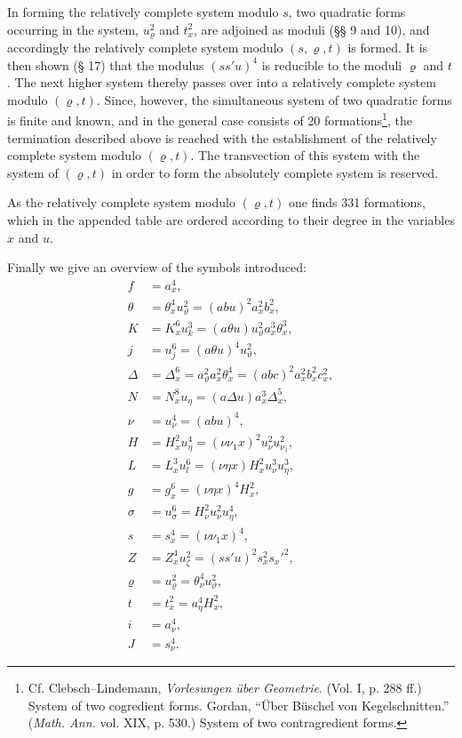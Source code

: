 \documentclass[11pt]{article}
\begin{document}
In forming the relatively complete system modulo $s$, two quadratic forms occurring in the system, $u_\varrho^2$ and $t_x^2$, are adjoined as moduli (§§ 9 and 10), and accordingly the relatively complete system modulo $(s,\varrho,t)$ is formed. It is then shown (§ 17) that the modulus $(ss'u)^4$ is reducible to the moduli $\varrho$ and $t$. The next higher system thereby passes over into a relatively complete system modulo $(\varrho,t)$. Since, however, the simultaneous system of two quadratic forms is finite and known, and in the general case consists of 20 formations\footnote{Cf. Clebsch--Lindemann, \emph{Vorlesungen über Geometrie}. (Vol. I, p. 288 ff.) System of two cogredient forms. Gordan, ``Über Büschel von Kegelschnitten.'' (\emph{Math. Ann.} vol. XIX, p. 530.) System of two contragredient forms.}, the termination described above is reached with the establishment of the relatively complete system modulo $(\varrho,t)$. The transvection of this system with the system of $(\varrho,t)$ in order to form the absolutely complete system is reserved.

As the relatively complete system modulo $(\varrho,t)$ one finds 331 formations, which in the appended table are ordered according to their degree in the variables $x$ and $u$.

Finally we give an overview of the symbols introduced:
\begin{align*}
f&=a_x^4,\\
\theta&=\theta_x^4u_\vartheta^2=(abu)^2a_x^2b_x^2,\\
K&=K_x^6u_k^3=(a\theta u)u_\vartheta^2a_x^3\theta_x^3,\\
j&=u_j^6=(a\theta u)^4u_\vartheta^2,\\
\Delta&=\Delta_x^6=a_\vartheta^2a_x^2\theta_x^4=(abc)^2a_x^2b_x^2c_x^2,\\
N&=N_x^8u_\eta=(a\Delta u)a_x^3\Delta_x^5,\\
\nu&=u_\nu^4=(abu)^4,\\
H&=H_x^2u_\eta^4=(\nu\nu_1x)^2u_\nu^2u_{\nu_1}^2,\\
L&=L_x^3u_l^6=(\nu\eta x)H_x^2u_\nu^3u_\eta^3,\\
g&=g_x^6=(\nu\eta x)^4H_x^2,\\
\sigma&=u_\sigma^6=H_\nu^2u_\nu^2u_\eta^4,\\
s&=s_x^4=(\nu\nu_1x)^4,\\
Z&=Z_x^4u_\zeta^2=(ss'u)^2s_x^2s_x'^2,\\
\varrho&=u_\varrho^2=\theta_\nu^4u_\vartheta^2,\\
t&=t_x^2=a_\eta^4H_x^2,\\
i&=a_\nu^4,\\
J&=s_\nu^4.
\end{align*}
\end{document}
